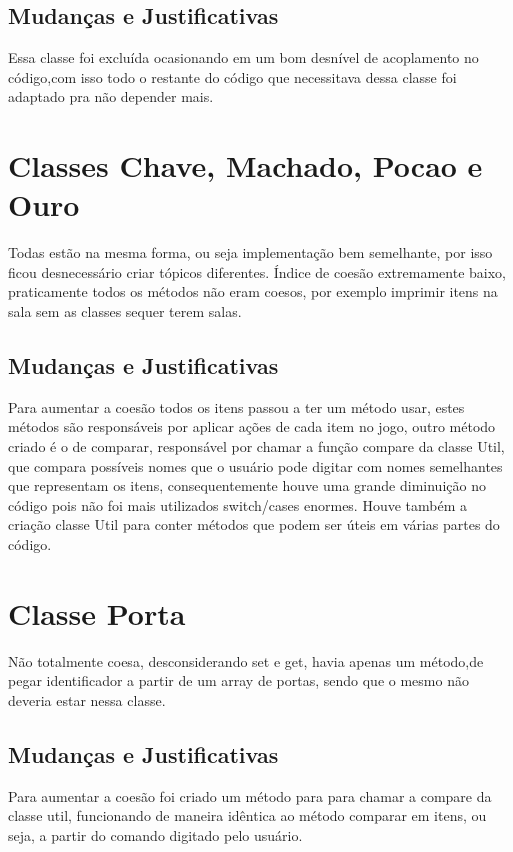 \documentclass[runningheads,a4paper]{llncs}
\begin{document}
\subsection{Mudanças e Justificativas}

Essa classe foi excluída ocasionando em um bom desnível de acoplamento no código,com isso todo o restante do código que necessitava dessa classe foi adaptado pra não depender mais. 

\section{Classes Chave, Machado, Pocao e Ouro}

Todas estão na mesma forma, ou seja implementação bem semelhante, por isso ficou desnecessário criar tópicos diferentes.
Índice de coesão extremamente baixo, praticamente todos os métodos não eram coesos, por exemplo imprimir itens na sala sem as classes sequer terem salas. 

\subsection{Mudanças e Justificativas}

Para aumentar a coesão todos os itens passou a ter um método usar, estes métodos são responsáveis por aplicar ações de cada item no jogo, outro método criado é o de comparar, responsável por chamar a função compare da classe Util, que compara possíveis nomes que o usuário pode digitar com nomes semelhantes que representam os itens, consequentemente houve uma grande diminuição no código pois não foi mais utilizados switch/cases enormes. Houve também a criação classe Util para conter métodos que podem ser úteis em várias partes do código.

\section{Classe Porta}

Não totalmente coesa, desconsiderando set e get, havia apenas um método,de pegar identificador a partir de um array de portas, sendo que o mesmo não deveria estar nessa classe.

\subsection{Mudanças e Justificativas}

Para aumentar a coesão foi criado um método para para chamar a compare da classe util, funcionando de maneira idêntica ao método comparar em itens, ou seja, a partir do comando digitado pelo usuário. 
\end{document}

